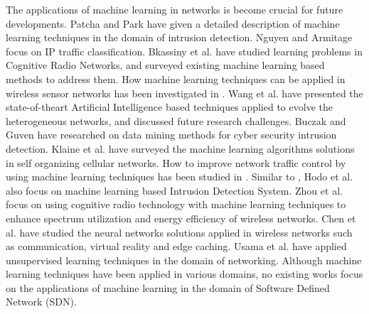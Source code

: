 The applications of machine learning in networks is become crucial for future developments. Patcha and Park \cite{Patcha2007} have given a detailed description of machine learning techniques in the domain of intrusion detection. Nguyen and Armitage \cite{Nguyen2008} focus on IP traffic classification. Bkassiny et al. \cite{Bkassiny2013} have studied learning problems in Cognitive Radio Networks, and surveyed existing machine learning based methods to address them. How machine learning techniques can be applied in wireless sensor networks has been investigated in \cite{Alsheikh2014}. Wang et al. \cite{Wang2015} have presented the state-of-theart Artificial Intelligence based techniques applied to evolve the heterogeneous networks, and discussed future research challenges. Buczak and Guven \cite{Buczak2016} have researched on data mining methods for cyber security intrusion detection. Klaine et al. \cite{Klaine2017} have surveyed the machine learning algorithms solutions in self organizing cellular networks. How to improve network traffic control by using machine learning techniques has been studied in \cite{Fadlullah2017}. Similar to \cite{Patcha2007}, Hodo et al. \cite{Hodo2017} also focus on machine learning based Intrusion Detection System. Zhou et al. \cite{Zhou2017} focus on using cognitive radio technology with machine learning techniques to enhance spectrum utilization and energy efficiency of wireless networks. Chen et al. \cite{Chen2017} have studied the neural networks solutions applied in wireless networks such as communication, virtual reality and edge caching. Usama et al. \cite{Usama2017} have applied unsupervised learning techniques in the domain of networking. Although machine learning techniques have been applied in various domains, no existing works focus on the applications of machine learning in the domain of Software Defined Network (SDN).

